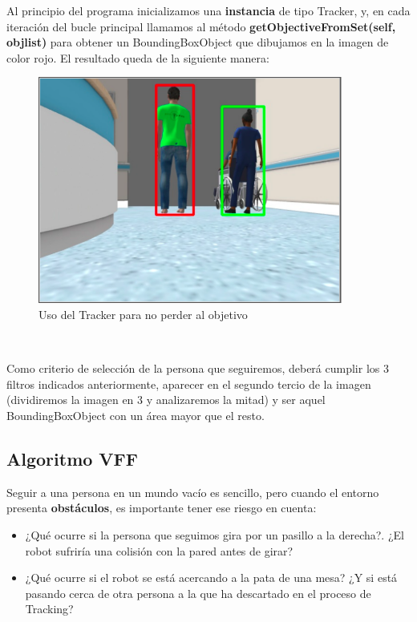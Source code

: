 Al principio del programa inicializamos una \textbf{instancia} de tipo Tracker, y, en cada iteración del bucle principal llamamos al método \textbf{getObjectiveFromSet(self, objlist)} para obtener un BoundingBoxObject que dibujamos en la imagen de color rojo. El resultado queda de la siguiente manera:\\

\begin{figure} [H]
  \begin{center}
    \includegraphics[width=10cm]{imagenes/aplicando-tracker.png}
  \end{center}
  \caption[Usando el Tracker para no perder al objetivo]{Uso del Tracker para no perder al objetivo}
  \label{fig:uso_tracker}
\end{figure}\

Como criterio de selección de la persona que seguiremos, deberá cumplir los 3 filtros indicados anteriormente, aparecer en el segundo tercio de la imagen (dividiremos la imagen en 3 y analizaremos la mitad) y ser aquel BoundingBoxObject con un área mayor que el resto.\\


\subsection{Algoritmo VFF}
\label{subsec:vff}

Seguir a una persona en un mundo vacío es sencillo, pero cuando el entorno presenta \textbf{obstáculos}, es importante tener ese riesgo en cuenta:\\

\begin{itemize}
	\item ¿Qué ocurre si la persona que seguimos gira por un pasillo a la derecha?. ¿El robot sufriría una colisión con la pared antes de girar?
	\item ¿Qué ocurre si el robot se está acercando a la pata de una mesa? ¿Y si está pasando cerca de otra persona a la que ha descartado en el proceso de Tracking?
\end{itemize}\

